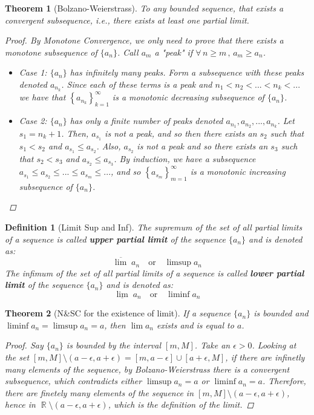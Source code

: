 \documentclass[12pt]{article}
\newcommand{\Forall}[1]{\forall\,{#1}\,,\,}
\newcommand{\seq}[2]{\left\{{#1}\right\}_{#2 =1}^\infty}
\DeclareMathOperator{\R}{\mathbb{R}}
\newtheorem{theorem}{Theorem}[subsection]
\newtheorem{definition}{Definition}[subsection]
\begin{document}
\begin{theorem}[Bolzano-Weierstrass]
  To any bounded sequence, that exists a convergent subsequence, i.e., there exists at least one partial limit.
  \begin{proof}
    By Monotone Convergence, we only need to prove that there exists a monotone subsequence of $\{a_n\}$. Call $a_m$ a "peak" if $\Forall{n\geq m}a_m\geq a_n$. 
    \begin{itemize}
      \item[] Case 1: $\{a_n\}$ has infinitely many peaks. Form a subsequence with these peaks denoted $a_{n_k}$. Since each of these terms is a peak and $n_1<n_2<...<n_k<...$ we have that $\seq{a_{n_k}}{k}$ is a monotonic decreasing subsequence of $\{a_n\}$.
      \item[] Case 2: $\{a_n\}$ has only a finite number of peaks denoted $a_{n_1},a_{n_2},...,a_{n_k}$. Let $s_1=n_k+1$. Then, $a_{s_1}$ is not a peak, and so then there exists an $s_2$ such that $s_1<s_2$ and $a_{s_1}\leq a_{s_2}$. Also, $a_{s_2}$ is not a peak and so there exists an $s_3$ such that $s_2<s_3$ and $a_{s_2}\leq a_{s_3}$. By induction, we have a subsequence $a_{s_1}\leq a_{s_2}\leq ...\leq a_{s_m}\leq ...$, and so $\seq{a_{s_m}}{m}$ is a monotonic increasing subsequence of $\{a_n\}$.
    \end{itemize}
  \end{proof}
\end{theorem}

\begin{definition}[Limit Sup and Inf]
  The supremum of the set of all partial limits of a sequence is called \textbf{upper partial limit} of the sequence $\{a_n\}$ and is denoted as:
  $$\overline{\lim}\;a_n\quad\text{or}\quad\limsup a_n$$
  The infimum of the set of all partial limits of a sequence is called \textbf{lower partial limit} of the sequence $\{a_n\}$ and is denoted as:
  $$\underline{\lim}\;a_n\quad\text{or}\quad\liminf a_n$$
\end{definition}

\begin{theorem}[N\&SC for the existence of limit]
  If a sequence $\{a_n\}$ is bounded and $\liminf a_n=\limsup a_n = a$, then $\lim a_n$ exists and is equal to $a$.
  \begin{proof}
    Say $\{a_n\}$ is bounded by the interval $[m,M]$. Take an $\epsilon>0$. Looking at the set $[m,M]\setminus(a-\epsilon,a+\epsilon)=[m,a-\epsilon]\cup[a+\epsilon,M]$, if there are infinetly many elements of the sequence, by Bolzano-Weierstrass there is a convergent subsequence, which contradicts either $\limsup a_n = a$ or $\liminf a_n = a$. Therefore, there are finetely many elements of the sequence in $[m,M]\setminus(a-\epsilon,a+\epsilon)$, hence in $\R\setminus(a-\epsilon,a+\epsilon)$, which is the definition of the limit.
  \end{proof}
\end{theorem}
\end{document}

